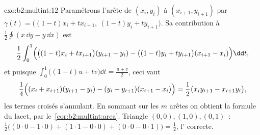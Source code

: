 \begin{solution}{exo:b2:multint:12}
Paramétrons l'arête de $(x_i, y_i)$ à $(x_{i+1}, y_{i+1})$
par $\gamma(t) = \bigl((1-t)x_i + tx_{i+1},\ (1-t)y_i +
ty_{i+1}\bigr)$. Sa contribution à
$\frac12\oint(x\,\dd y - y\,\dd x)$ est
\[
\frac12\int_0^1\Bigl(\bigl((1-t)x_i +
tx_{i+1}\bigr)(y_{i+1} - y_i) - \bigl((1-t)y_i +
ty_{i+1}\bigr)(x_{i+1} - x_i)\Bigr)\dd t ,
\]
et puisque $\int_0^1\bigl((1-t)u + tv\bigr)\dd t = \frac{u +
v}2$, ceci vaut
\[
\frac14\Bigl((x_i + x_{i+1})(y_{i+1} - y_i) - (y_i +
y_{i+1})(x_{i+1} - x_i)\Bigr)
= \frac12\bigl(x_iy_{i+1} - x_{i+1}y_i\bigr),
\]
les termes croisés s'annulant. En sommant sur les $m$ arêtes on obtient
la formule du lacet, par le~\cref{cor:b2:multint:area}. Triangle
$(0,0), (1,0), (0,1)$~: $\frac12\bigl((0\cdot0 - 1\cdot0) +
(1\cdot1 - 0\cdot0) + (0\cdot0 - 0\cdot1)\bigr) = \frac12$,
l' correcte.
\end{solution}


